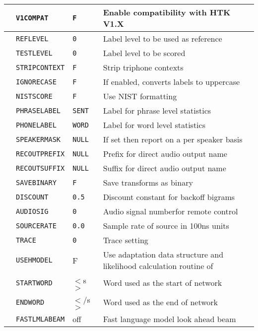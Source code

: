 \begin{center}
\begin{supertabular}{|p{1.8cm}|l|l|p{6.6cm}|}
 & \texttt{V1COMPAT} & \texttt{F} & Enable compatibility with HTK V1.X \\ \hline

  & \texttt{REFLEVEL} & \texttt{0} & Label level to be used as reference \\ 
  & \texttt{TESTLEVEL} & \texttt{0} & Label level to be scored \\ 
  & \texttt{STRIPCONTEXT} & \texttt{F} & Strip triphone contexts \\ 
 & \texttt{IGNORECASE} & \texttt{F} & If enabled,
  converts labels to uppercase \\ 
  & \texttt{NISTSCORE} & \texttt{F} & Use NIST formatting \\ 
  & \texttt{PHRASELABEL} & \texttt{SENT} & Label for phrase level statistics \\ 
  & \texttt{PHONELABEL} & \texttt{WORD} & Label for word level statistics \\ 
  & \texttt{SPEAKERMASK} & \texttt{NULL} & If set then report on a per
  speaker basis \\ \hline 

  & \texttt{RECOUTPREFIX} & \texttt{NULL} & Prefix for direct
  audio output name \\ 
 & \texttt{RECOUTSUFFIX} & \texttt{NULL} & Suffix for direct audio output name\\ 
  & \texttt{SAVEBINARY} & \texttt{F} & Save transforms as binary \\ \hline

 & \texttt{DISCOUNT} & \texttt{0.5} & Discount constant
  for backoff bigrams\\ \hline

  & \texttt{AUDIOSIG} & \texttt{0} & Audio signal numberfor remote control 
  \\ 
  & \texttt{SOURCERATE} & \texttt{0.0} & Sample rate of source in 100ns units 
  \\ \hline

  & \texttt{TRACE} & \texttt{0} & Trace setting\\ \hline

& \texttt{USEHMODEL} & F & Use adaptation data structure and likelihood calculation routine of 
 \\
 & \texttt{STARTWORD} & $<$s$>$ & Word used as the start of network \\
 & \texttt{ENDWORD} & $<$/s$>$ & Word used as the end of network \\
 & \texttt{FASTLMLABEAM} & off & Fast language model look ahead beam \\\hline

\end{supertabular}
\end{center}
\clearpage


